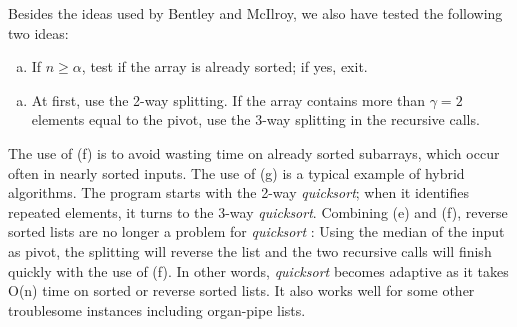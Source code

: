 \documentclass[AMA,STIX1COL]{WileyNJD-v2}
\newcommand{\qusort}{\emph{quicksort }}
\newcommand{\qusortn}{\emph{quicksort}}
\newcommand{\qsort}{\emph{qsort }}
\newcommand{\qsortn}{\emph{qsort}}
\begin{document}
Besides the ideas used by Bentley and McIlroy, we also have tested the following two ideas:

\begin{enumerate}[(f)]
\item If $n \geq \alpha$, test if the array is already sorted; if yes, exit.
\end{enumerate}
\begin{enumerate}[(g)]
\item At first, use the 2-way splitting. If the array contains more than $\gamma = 2$ elements equal to the pivot, use the 3-way splitting in the recursive calls.
\end{enumerate}

The use of (f) is to avoid wasting time on already sorted subarrays, which occur often in nearly sorted inputs. 
The use of (g) is a typical example of hybrid algorithms.  
The program starts with the 2-way \qusortn; when it identifies repeated elements, it turns to the 3-way \qusortn. 
Combining (e) and (f), reverse sorted lists are no longer a problem for \qusort: Using the median of the input as pivot, the splitting will reverse the list and the two recursive calls will finish quickly with the use of (f). 
In other words, \qusort becomes adaptive as it takes O(n) time on sorted or reverse sorted lists. 
It also works well for some other troublesome instances including organ-pipe lists.
\end{document}
